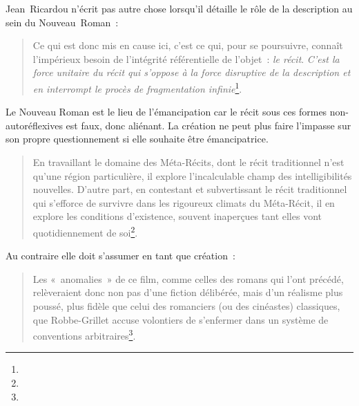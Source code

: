 \documentclass[12pt, a4paper]{article}
\begin{document}
Jean~Ricardou n'écrit pas autre chose lorsqu'il détaille le rôle de la description au sein du Nouveau~Roman~:
\begin{quote}
    Ce qui est donc mis en cause ici, c'est ce qui, pour se poursuivre, connaît l'impérieux besoin de l'intégrité référentielle de l'objet~: \textit{le récit}. \textit{C'est la force unitaire du récit qui s'oppose à la force disruptive de la description et en interrompt le procès de fragmentation infinie}\footnote{}.
\end{quote}
Le Nouveau Roman est le lieu de l'émancipation car le récit sous ces formes non-autoréflexives est faux, donc aliénant. La création ne peut plus faire l'impasse sur son propre questionnement si elle souhaite être émancipatrice.
\begin{quote}
    En travaillant le domaine des Méta-Récits, dont le récit traditionnel n'est qu'une région particulière,  il explore l'incalculable champ des intelligibilités nouvelles. D'autre part, en contestant et subvertissant le récit traditionnel qui s'efforce de survivre dans les rigoureux climats du Méta-Récit, il en explore les conditions d'existence, souvent inaperçues tant elles vont quotidiennement de soi\footnote{}.
\end{quote}
Au contraire elle doit s'assumer en tant que création~:
\begin{quote}
    Les «~anomalies~» de ce film, comme celles des romans qui l'ont précédé, relèveraient donc non pas d'une fiction délibérée, mais d'un réalisme plus poussé, plus fidèle que celui des romanciers (ou des cinéastes) classiques, que Robbe-Grillet accuse volontiers de s'enfermer dans un système de conventions arbitraires\footnote{}.
\end{quote}
\end{document}
